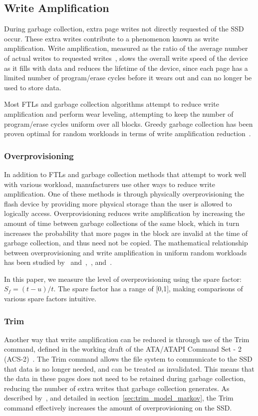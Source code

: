 \documentclass[prodmode,acmtos]{acmsmall}
\begin{document}
\subsection{Write Amplification}
During garbage collection, extra page writes not directly requested of the SSD occur.  These extra writes contribute to a phenomenon known as write amplification.  Write amplification, measured as the ratio of the average number of actual writes to requested writes~\cite{Hu2009}, slows the overall write speed of the device as it fills with data and reduces the lifetime of the device, since each page has a limited number of program/erase cycles before it wears out and can no longer be used to store data.

Most FTLs and garbage collection algorithms attempt to reduce write amplification and perform wear leveling, attempting to keep the number of program/erase cycles uniform over all blocks.  Greedy garbage collection has been proven optimal for random workloads in terms of write amplification reduction~\cite{hu2010fundamental}.

\subsubsection{Overprovisioning}
In addition to FTLs and garbage collection methods that attempt to work well with various workload, manufacturers use other ways to reduce write amplification.  One of these methods is through physically overprovisioning the flash device by providing more physical storage than the user is allowed to logically access.  Overprovisioning reduces write amplification by increasing the amount of time between garbage collections of the same block, which in turn increases the probability that more pages in the block are invalid at the time of garbage collection, and thus need not be copied.  The mathematical relationship between overprovisioning and write amplification in uniform random workloads has been studied by~ and~,~, and~.

In this paper, we measure the level of overprovisioning using the spare factor: $S_f = (t-u)/t$.  The spare factor has a range of [0,1], making comparisons of various spare factors intuitive.

\subsubsection{Trim}
Another way that write amplification can be reduced is through use of the Trim command, defined in the working draft of the ATA/ATAPI Command Set - 2 (ACS-2)~\cite{TrimSpec}.  The Trim command allows the file system to communicate to the SSD that data is no longer needed, and can be treated as invalidated.  This means that the data in these pages does not need to be retained during garbage collection, reducing the number of extra writes that garbage collection generates.  As described by~, and detailed in section~\ref{sec:trim_model_markov}, the Trim command effectively increases the amount of overprovisioning on the SSD.
\end{document}
